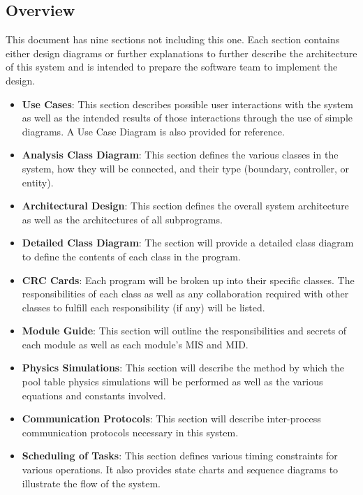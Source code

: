 \documentclass[titlepage]{article}
\begin{document}
\subsection{Overview}
This document has nine sections not including this one. Each section contains either design diagrams or further explanations to further describe the architecture of this system and is intended to prepare the software team to implement the design.\\
\begin{itemize}
	\item \textbf{Use Cases}: This section describes possible user interactions with the system as well as the intended results of those interactions through the use of simple diagrams. A Use Case Diagram is also provided for reference.\\
	\item \textbf{Analysis Class Diagram}: This section defines the various classes in the system, how they will be connected, and their type (boundary, controller, or entity).\\
	\item \textbf{Architectural Design}: This section defines the overall system architecture as well as the architectures of all subprograms.\\
	\item \textbf{Detailed Class Diagram}: The section will provide a detailed class diagram to define the contents of each class in the program.\\
	\item \textbf{CRC Cards}: Each program will be broken up into their specific classes. The responsibilities of each class as well as any collaboration required with other classes to fulfill each responsibility (if any) will be listed.\\
	\item \textbf{Module Guide}: This section will outline the responsibilities and secrets of each module as well as each module's MIS and MID.\\
	\item \textbf{Physics Simulations}: This section will describe the method by which the pool table physics simulations will be performed as well as the various equations and constants involved.\\
	\item \textbf{Communication Protocols}: This section will describe inter-process communication protocols necessary in this system.\\
	\item \textbf{Scheduling of Tasks}: This section defines various timing constraints for various operations. It also provides state charts and sequence diagrams to illustrate the flow of the system.\\
\end{itemize}
\newpage
\end{document}
